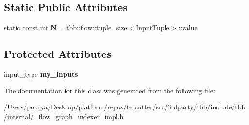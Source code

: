 \subsection*{Static Public Attributes}
\begin{DoxyCompactItemize}
\item 
\hypertarget{classinternal_1_1indexer__node__FE_aaf76ab693e69b276373f772841a35fdd}{}static const int {\bfseries N} = tbb\+::flow\+::tuple\+\_\+size$<$Input\+Tuple$>$\+::value\label{classinternal_1_1indexer__node__FE_aaf76ab693e69b276373f772841a35fdd}

\end{DoxyCompactItemize}
\subsection*{Protected Attributes}
\begin{DoxyCompactItemize}
\item 
\hypertarget{classinternal_1_1indexer__node__FE_ab3e4c697d43a914ed3218be6341be203}{}input\+\_\+type {\bfseries my\+\_\+inputs}\label{classinternal_1_1indexer__node__FE_ab3e4c697d43a914ed3218be6341be203}

\end{DoxyCompactItemize}


The documentation for this class was generated from the following file\+:\begin{DoxyCompactItemize}
\item 
/\+Users/pourya/\+Desktop/platform/repos/tetcutter/src/3rdparty/tbb/include/tbb/internal/\+\_\+flow\+\_\+graph\+\_\+indexer\+\_\+impl.\+h\end{DoxyCompactItemize}
